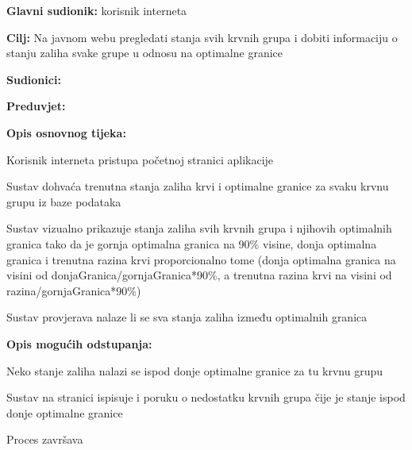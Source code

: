 					
					\noindent {}
					\begin{packed_item}
	
						\item \textbf{Glavni sudionik: }korisnik interneta
						\item  \textbf{Cilj:} Na javnom webu pregledati stanja svih krvnih grupa i dobiti informaciju o stanju zaliha svake grupe u odnosu na optimalne granice
						\item  \textbf{Sudionici:}
						\item  \textbf{Preduvjet:} 
						\item  \textbf{Opis osnovnog tijeka:}
						
						\item[] \begin{packed_enum}
	
	                        \item Korisnik interneta pristupa početnoj stranici aplikacije
	                        \item Sustav dohvaća trenutna stanja zaliha krvi i optimalne granice za svaku krvnu grupu iz baze podataka
	                        \item Sustav vizualno prikazuje stanja zaliha svih krvnih grupa i njihovih optimalnih granica tako da je gornja optimalna granica na 90\% visine, donja optimalna granica i trenutna razina krvi proporcionalno tome (donja optimalna granica na visini od donjaGranica/gornjaGranica*90\%, a trenutna razina krvi na visini od razina/gornjaGranica*90\%)
	                        \item Sustav provjerava nalaze li se sva stanja zaliha između optimalnih granica

						\end{packed_enum}
						
						\item  \textbf{Opis mogućih odstupanja:}
						
						\item[] \begin{packed_item}
	
							\item[4] Neko stanje zaliha nalazi se ispod donje optimalne granice za tu krvnu grupu 
							\begin{packed_enum}
								\item Sustav na stranici ispisuje i poruku o nedostatku krvnih grupa čije je stanje ispod donje optimalne granice
								\item Proces završava
							\end{packed_enum}
							
						\end{packed_item}
						
					\end{packed_item}
					
